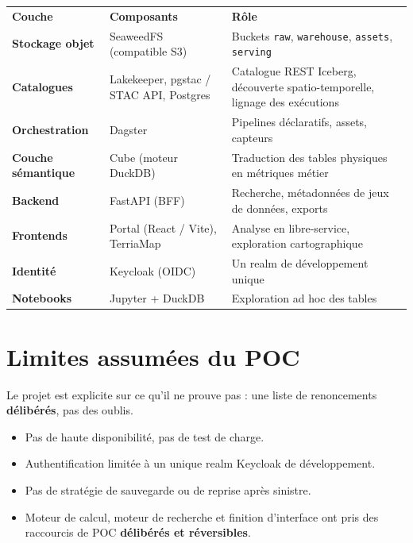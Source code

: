 \documentclass[11pt,a4paper]{article}
\newcommand{\tblhead}[1]{\headingfont\bfseries\footnotesize\color{white} #1}
\begin{document}
\begin{center}
\small
\begin{tabular}{@{} M{2.6cm} M{4.4cm} M{\dimexpr\textwidth-2.6cm-4.4cm-4\tabcolsep\relax} @{}}
\tblhead{Couche} & \tblhead{Composants} & \tblhead{Rôle} \\
 \bfseries\color{teal} Stockage objet & SeaweedFS (compatible S3) & Buckets \texttt{raw}, \texttt{warehouse}, \texttt{assets}, \texttt{serving} \\
\bfseries\color{teal} Catalogues & Lakekeeper, pgstac / STAC API, Postgres & Catalogue REST Iceberg, découverte spatio-temporelle, lignage des exécutions \\
 \bfseries\color{teal} Orchestration & Dagster & Pipelines déclaratifs, assets, capteurs \\
\bfseries\color{teal} Couche sémantique & Cube (moteur DuckDB) & Traduction des tables physiques en métriques métier \\
 \bfseries\color{teal} Backend & FastAPI (BFF) & Recherche, métadonnées de jeux de données, exports \\
\bfseries\color{teal} Frontends & Portal (React / Vite), TerriaMap & Analyse en libre-service, exploration cartographique \\
 \bfseries\color{teal} Identité & Keycloak (OIDC) & Un realm de développement unique \\
\bfseries\color{teal} Notebooks & Jupyter + DuckDB & Exploration ad hoc des tables \\
\end{tabular}
\end{center}

\section{Limites assumées du POC}

Le projet est explicite sur ce qu'il ne prouve pas : une liste de renoncements \textbf{délibérés}, pas des oublis.

\begin{itemize}[leftmargin=1.2em, itemsep=3pt]
\item Pas de haute disponibilité, pas de test de charge.
\item Authentification limitée à un unique realm Keycloak de développement.
\item Pas de stratégie de sauvegarde ou de reprise après sinistre.
\item Moteur de calcul, moteur de recherche et finition d'interface ont pris des raccourcis de POC \textbf{délibérés et réversibles}.
\end{itemize}
\end{document}

